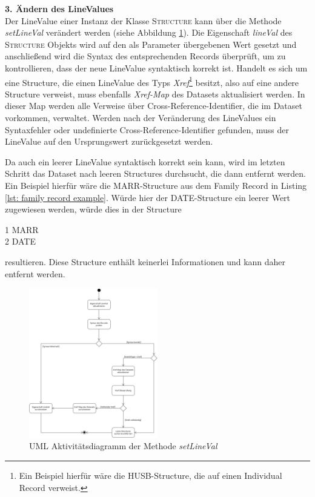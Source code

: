 \vspace{1em}
\textbf{3. Ändern des LineValues} \vspace{0.5em} \\
Der LineValue einer Instanz der Klasse \textsc{Structure} kann über die Methode \textit{setLineVal} verändert werden (siehe Abbildung \ref{fig: UML Aktivität setLineVal}). Die Eigenschaft \textit{lineVal} des \textsc{Structure} Objekts wird auf den als Parameter übergebenen Wert gesetzt und anschließend wird die Syntax des entsprechenden Records überprüft, um zu kontrollieren, dass der neue LineValue syntaktisch korrekt ist.
Handelt es sich um eine Structure, die einen LineValue des Typs \textit{Xref}\footnote{Ein Beispiel hierfür wäre die HUSB-Structure, die auf einen Individual Record verweist.} besitzt, also auf eine andere Structure verweist, muss ebenfalls \textit{Xref-Map} des Datasets aktualisiert werden. In dieser Map werden alle Verweise über Cross-Reference-Identifier, die im Dataset vorkommen, verwaltet. Werden nach der Veränderung des LineValues ein Syntaxfehler oder undefinierte Cross-Reference-Identifier gefunden, muss der LineValue auf den Ursprungswert zurückgesetzt werden. 

Da auch ein leerer LineValue syntaktisch korrekt sein kann, wird im letzten Schritt das Dataset nach leeren Structures durchsucht, die dann entfernt werden. Ein Beispiel hierfür wäre die MARR-Structure aus dem Family Record in Listing \ref{lst: family record example}. Würde hier der DATE-Structure ein leerer Wert zugewiesen werden, würde dies in der Structure
\begin{center}
	1 MARR\\
	2 DATE
\end{center}
resultieren. Diese Structure enthält keinerlei Informationen und kann daher entfernt werden.
 
\begin{figure}[h]
	\centering
	\includegraphics[width=0.5\textwidth]{images/UML_Activity_SetLineVal.png}
	\caption{UML Aktivitätsdiagramm der Methode \textit{setLineVal}}
	\label{fig: UML Aktivität setLineVal}
\end{figure}



